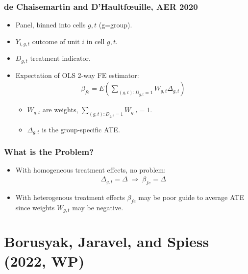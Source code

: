 \documentclass[english,xcolor=svgnames]{beamer}
\begin{document}
\begin{frame}
\frametitle[alignment=center]{de Chaisemartin and D'Haultf{\oe}uille, AER 2020}
\begin{itemize}
	\item Panel, binned into cells $g,t$ (g=group).
	\item $Y_{i,g,t}$ outcome of unit $i$ in cell $g,t$.
	\item $D_{g,t}$ treatment indicator.
	\item Expectation of OLS 2-way FE estimator:
	\begin{align*}
		\beta_{fe} = E \left(\sum_{(g,t):D_{g,t}=1} W_{g,t}\Delta_{g,t}\right)
	\end{align*}
	\begin{itemize}
		\item $W_{g,t}$ are weights, $\sum_{(g,t):D_{g,t}=1} W_{g,t}=1$.
		\item $\Delta_{g,t}$ is the group-specific ATE.
	\end{itemize}
\end{itemize}
\end{frame}

\begin{frame}
\frametitle[alignment=center]{What is the Problem?}
\begin{itemize}
	\item With homogeneous treatment effects, no problem:
	\begin{align*}
		 \Delta_{g,t}=\Delta \;\Rightarrow\; \beta_{fe} = \Delta
	\end{align*}
	\item With heterogenous treatment effects $\beta_{fe}$ may be poor guide to average ATE since weights $W_{g,t}$ may be negative.
\end{itemize}
\end{frame}

\section{Borusyak, Jaravel, and Spiess (2022, WP)}
\end{document}
